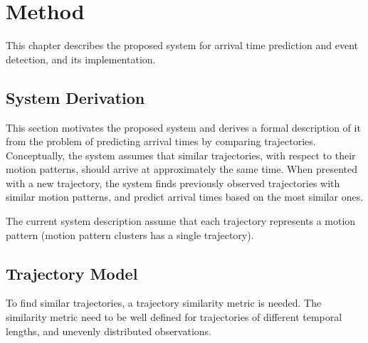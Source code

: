 \chapter{Method}
\label{cha:method}
This chapter describes the proposed system for arrival time prediction
and event detection, and its implementation.

\section{System Derivation}
This section motivates the proposed system and derives a formal
description of it from the
problem of predicting arrival times by comparing trajectories. 
Conceptually, the system assumes that similar trajectories, with
respect to their motion patterns, should arrive at 
approximately the same time. When presented with a new trajectory, the system
finds previously observed trajectories with similar motion patterns,
and predict arrival times based on the most similar ones.

The current system description assume that each trajectory represents
a motion pattern (motion pattern clusters has a single trajectory).

\section{Trajectory Model}
To find similar trajectories, a trajectory similarity metric 
is needed. The similarity metric need to be well defined for
trajectories of different temporal lengths, and unevenly
distributed observations.

